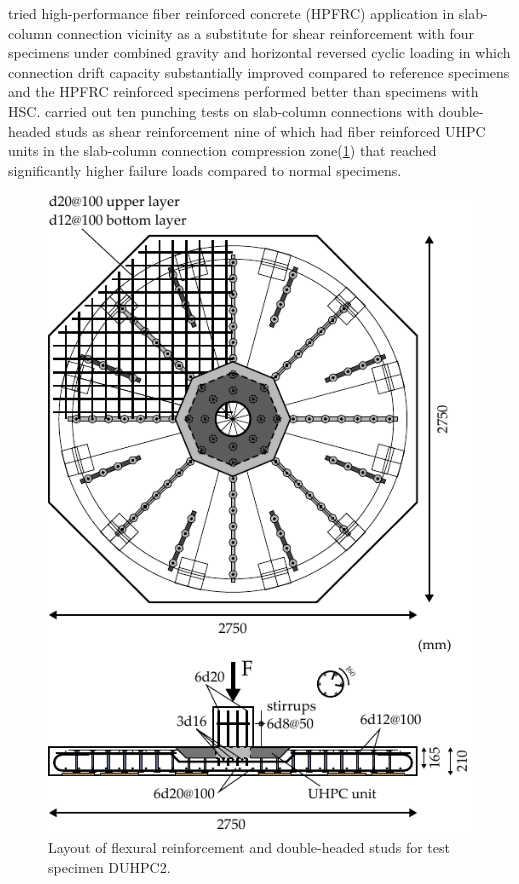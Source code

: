 \cite{ramos2022} tried high-performance fiber reinforced concrete (HPFRC) application in slab-column connection vicinity as a substitute for shear reinforcement with four specimens under combined gravity and horizontal reversed cyclic loading in which connection drift capacity substantially improved compared to reference specimens and the HPFRC reinforced specimens performed better than specimens with HSC. \cite{ricker2017} carried out ten punching tests on slab-column connections with double-headed studs as shear reinforcement nine of which had fiber reinforced UHPC units in the slab-column connection compression zone(\ref{r2017f1}) that reached significantly higher failure loads compared to normal specimens. 
\begin{figure}\centering
    \includegraphics[width=\columnwidth]{Figures/r2017f1.pdf}\caption{Layout of flexural reinforcement and double-headed studs for test specimen DUHPC2\citep{ricker2017}.}\label{r2017f1}
    \end{figure}
